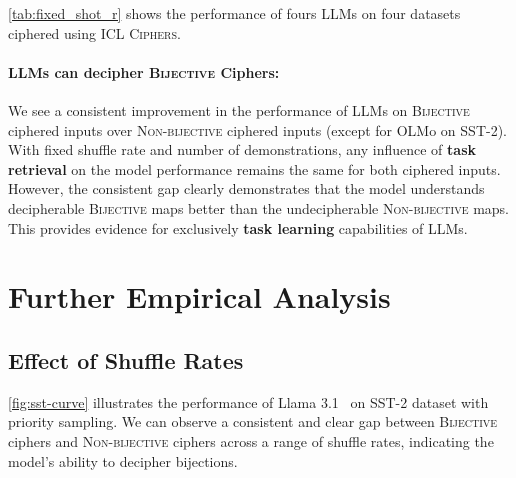 \documentclass[11pt]{article}
\newcommand{\daniel}[1]{{\color{purple}[{\bf DK}: #1]}}
\newcommand{\name}{\textsc{ICL Ciphers}}
\newcommand{\llama}{Llama 3.1 }
\newcommand{\olmo}{OLMo }
\begin{document}
\autoref{tab:fixed_shot_r} shows the performance of fours LLMs on four datasets ciphered using \name{}.

\paragraph{LLMs can decipher \textsc{Bijective} Ciphers:}
We see a consistent improvement in the performance of LLMs on \textsc{Bijective} ciphered inputs over \textsc{Non-bijective} ciphered inputs (except for \olmo on SST-2). With fixed shuffle rate and number of demonstrations, any influence of \textbf{task retrieval} on the model performance remains the same for both ciphered inputs. However, the consistent gap clearly demonstrates that the model understands decipherable \textsc{Bijective} maps better than the undecipherable \textsc{Non-bijective} maps. This provides evidence for exclusively \textbf{task learning} capabilities of LLMs.






\section{Further Empirical Analysis}




\subsection{Effect of Shuffle Rates}
\label{subse:shuffle-rate}
\autoref{fig:sst-curve} illustrates the performance of \llama~on SST-2 dataset with priority sampling.
We can observe a consistent and clear gap between \textsc{Bijective} ciphers and \textsc{Non-bijective} ciphers across a range of shuffle rates, indicating the model's ability to decipher bijections.
\end{document}
